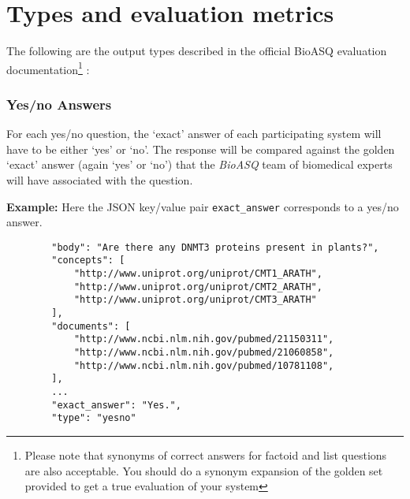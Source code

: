 \section{Types and evaluation metrics}
The following  are the output types described in the official BioASQ evaluation documentation\footnote{Please note that synonyms of correct answers for factoid and list questions are also acceptable. You should do a synonym expansion of the golden set provided to get a true evaluation of your system} \cite{145}:
\subsubsection{Yes/no Answers}
\begin{displayquote}
For each yes/no question, the `exact' answer of each participating system will have to be either `yes'
or `no'. The response will be compared against the golden `exact' answer (again `yes' or `no') that
the \emph{BioASQ} team of biomedical experts will have associated with the question.
\end{displayquote}
\textbf{Example:} Here the JSON key/value pair  \verb|exact_answer| corresponds to a yes/no answer.  
\small
\begin{verbatim}
        "body": "Are there any DNMT3 proteins present in plants?", 
        "concepts": [
            "http://www.uniprot.org/uniprot/CMT1_ARATH", 
            "http://www.uniprot.org/uniprot/CMT2_ARATH", 
            "http://www.uniprot.org/uniprot/CMT3_ARATH"
        ], 
        "documents": [
            "http://www.ncbi.nlm.nih.gov/pubmed/21150311", 
            "http://www.ncbi.nlm.nih.gov/pubmed/21060858", 
            "http://www.ncbi.nlm.nih.gov/pubmed/10781108", 
        ], 
        ...
        "exact_answer": "Yes.", 
        "type": "yesno"
\end{verbatim}
\normalsize
